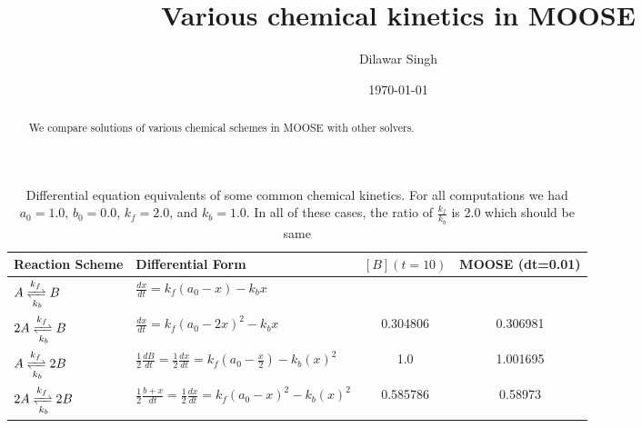 \documentclass[]{article}
\title{Various chemical kinetics in MOOSE}
\author{Dilawar Singh}
\date{\today}
\begin{document}
\maketitle

\begin{abstract}

 We compare solutions of various chemical schemes in MOOSE with other solvers. 
 
\end{abstract}

\begin{table*}[h]
    \begin{tabular}{p{} p{} c c }
        Reaction Scheme & Differential Form & $[B](t=10)$  & MOOSE (dt=0.01)  \\
        \hline

        $A \xrightleftharpoons[k_b]{k_f} B$ & $\frac{dx}{dt} = k_f(a_0 -x) - k_b x $ &  \\

        $2A \xrightleftharpoons[k_b]{k_f} B$ & $\frac{dx}{dt} = k_f(a_0 - 2x)^2
        - k_b x$ & 0.304806 &  0.306981 \\

        $A \xrightleftharpoons[k_b]{k_f} 2B$ & $\frac{1}{2} \frac{dB}{dt} =
        \frac{1}{2} \frac{dx}{dt} = k_f(a_0 - \frac{x}{2}) - k_b(x)^2$ 
        & 1.0 & 1.001695 \\

        $2A \xrightleftharpoons[k_b]{k_f} 2B$ & $\frac{1}{2} \frac{b+x}{dt} =
        \frac{1}{2} \frac{dx}{dt} = k_f(a_0 - x)^2 - k_b(x)^2 $ & 0.585786 &
        0.58973 \\

    \end{tabular}
    \caption{Differential equation equivalents of some common chemical kinetics.
        For all computations we had $a_0 = 1.0$, $b_0 = 0.0$, $k_f = 2.0$, and
        $k_b=1.0$. In all of these cases, the ratio of $\frac{k_f}{k_b}$ is 2.0 which
    should be same }
    \label{tab:reacs}
\end{table*}
\end{document}
